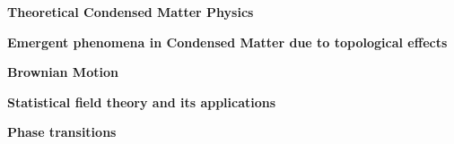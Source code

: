 

\begin{cventries}

  \cventry
    {} %
    {} %
    {} %
    {} %
    {
      \begin{cvitems} %
        \item {\textbf{Theoretical Condensed Matter Physics}}
        \item {\textbf{Emergent phenomena in Condensed Matter due to topological effects}}
        \item {\textbf{Brownian Motion}}
        \item {\textbf{Statistical field theory and its applications}}
        \item {\textbf{Phase transitions}}
      \end{cvitems}
    }

\end{cventries}

